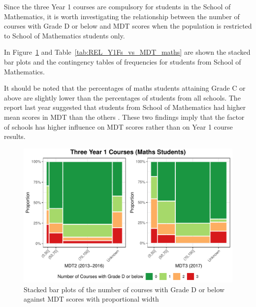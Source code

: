 \documentclass[a4paper]{report}
\begin{document}
Since the three Year 1 courses are compulsory for students in the School of Mathematics, it is worth investigating the relationship between the number of courses with Grade D or below and MDT scores when the population is restricted to School of Mathematics students only. 

In Figure~\ref{fig:REL_Y1Fs_vs_MDT_maths} and Table~\ref{tab:REL_Y1Fs_vs_MDT_maths} are shown the stacked bar plots and the contingency tables of frequencies for students from School of Mathematics. 

It should be noted that the percentages of maths students attaining Grade C or above are slightly lower than the percentages of students from all schools. The report last year suggested that students from School of Mathematics had higher mean scores in MDT than the others \cite{lastyear}. These two findings imply that the factor of schools has higher influence on MDT scores rather than on Year 1 course results. 

\begin{figure}[H]
  \centering
  \includegraphics[width=\linewidth]{fig/REL_Y1Fs_vs_MDT_maths.pdf}
  \caption{\label{fig:REL_Y1Fs_vs_MDT_maths}Stacked bar plots of the number of courses with Grade D or below against MDT scores with proportional width}
\end{figure}
\end{document}
